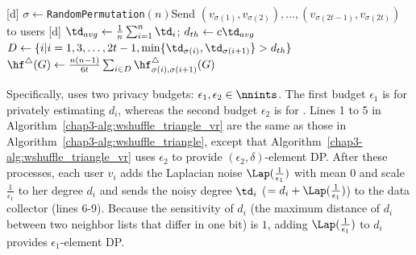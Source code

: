 \setlength{\algomargin}{5mm}
\begin{algorithm}[t]
  \SetAlgoLined
  [d] $\sigma \leftarrow$\texttt{RandomPermutation}$(n)$\;
  [d] Send $(v_{\sigma(1)}, v_{\sigma(2)}), \ldots, (v_{\sigma(2t-1)}, v_{\sigma(2t)})$ to users\;
  [d] $\td_{avg} \leftarrow \frac{1}{n} \sum_{i=1}^n \td_i$; $d_{th} \leftarrow c \td_{avg}$\;
  [d] $D \leftarrow \{i | i = 1, 3, \ldots, 2t-1, 
  \min\{\td_{\sigma(i)}, \td_{\sigma(i+1)}\} > d_{th}\}$\;
  [d] $\hf^\triangle(G) \leftarrow \frac{n(n-1)}{6t} \sum_{i \in D} \hf_{\sigma(i),\sigma(i+1)}^\triangle(G)$\;
  \caption{Our triangle counting algorithm with variance reduction \AlgWSTriVR{}.
  \AlgWSLE{} is shown in Algorithm~\ref{chap3-alg:WSLE}. 
  }\label{chap3-alg:wshuffle_triangle_vr}
\end{algorithm}

Specifically, \AlgWSTriVR{} uses two privacy budgets: $\epsilon_1, \epsilon_2 \in \nnints$. 
The first budget $\epsilon_1$ is for privately estimating $d_i$, whereas the second budget $\epsilon_2$ is for 
\AlgWSLE{}. 
Lines 1 to 5 in Algorithm~\ref{chap3-alg:wshuffle_triangle_vr} are the same as those in Algorithm~\ref{chap3-alg:wshuffle_triangle}, except that Algorithm~\ref{chap3-alg:wshuffle_triangle_vr} uses $\epsilon_2$ 
to provide $(\epsilon_2, \delta)$-element DP. 
After these processes, each user $v_i$ adds the Laplacian noise $\Lap(\frac{1}{\epsilon_1})$ with mean $0$ and scale $\frac{1}{\epsilon_1}$ to her degree $d_i$ and sends the noisy degree $\td_i$ ($= d_i + \Lap(\frac{1}{\epsilon_1})$) to the data collector (lines 6-9). 
Because the sensitivity \cite{DP} of $d_i$ (the maximum distance of $d_i$ between two neighbor lists that differ in one bit) is $1$, adding $\Lap(\frac{1}{\epsilon_1})$ to $d_i$ provides $\epsilon_1$-element DP. 

